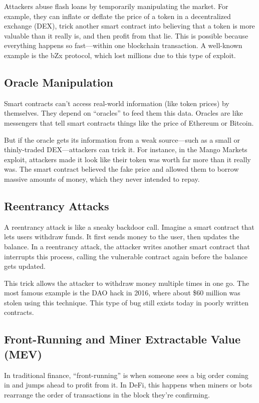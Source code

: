 \documentclass[conference]{IEEEtran}
\begin{document}
Attackers abuse flash loans by temporarily manipulating the market. For example, they can inflate or deflate the price of a token in a decentralized exchange (DEX), trick another smart contract into believing that a token is more valuable than it really is, and then profit from that lie. This is possible because everything happens so fast—within one blockchain transaction. A well-known example is the bZx protocol, which lost millions due to this type of exploit.

\subsection{Oracle Manipulation}

Smart contracts can't access real-world information (like token prices) by themselves. They depend on “oracles” to feed them this data. Oracles are like messengers that tell smart contracts things like the price of Ethereum or Bitcoin.

But if the oracle gets its information from a weak source—such as a small or thinly-traded DEX—attackers can trick it. For instance, in the Mango Markets exploit, attackers made it look like their token was worth far more than it really was. The smart contract believed the fake price and allowed them to borrow massive amounts of money, which they never intended to repay.

\subsection{Reentrancy Attacks}

A reentrancy attack is like a sneaky backdoor call. Imagine a smart contract that lets users withdraw funds. It first sends money to the user, then updates the balance. In a reentrancy attack, the attacker writes another smart contract that interrupts this process, calling the vulnerable contract again before the balance gets updated.

This trick allows the attacker to withdraw money multiple times in one go. The most famous example is the DAO hack in 2016, where about \$60 million was stolen using this technique. This type of bug still exists today in poorly written contracts.

\subsection{Front-Running and Miner Extractable Value (MEV)}

In traditional finance, “front-running” is when someone sees a big order coming in and jumps ahead to profit from it. In DeFi, this happens when miners or bots rearrange the order of transactions in the block they're confirming.
\end{document}
